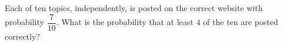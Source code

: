Each of ten topics, independently, is posted on the correct website with probability $\dfrac{7}{10}$. What is the probability that at least $4$ of the ten are posted correctly?
